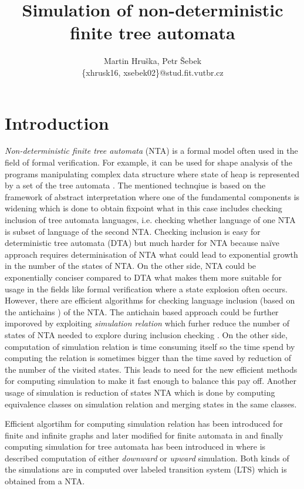 \documentclass[a4paper, 12pt]{article}
\title{Simulation of non-deterministic finite tree automata}
\author{Martin Hruška, Petr Šebek\\\{xhrusk16, xsebek02\}@stud.fit.vutbr.cz}
\date{}
\begin{document}
\maketitle

\section{Introduction}
\label{sec:intro}

\textit{Non-deterministic finite tree automata} (NTA) is a formal model often used in the field of formal verification.
For example, it can be used for shape analysis of the programs manipulating complex data structure where
state of heap is represented by a set of the tree automata \cite{methods12}.
The mentioned technqiue is based on the framework of abstract interpretation where one of the fundamental components
is widening which is done to obtain fixpoint what in this case includes checking inclusion of tree automata languages, i.e.
checking whether language of one NTA is subset of language of the second NTA.
Checking inclusion is easy for deterministic tree automata (DTA) but much harder for NTA because
na{\"i}ve approach requires determinisation of NTA what could lead to exponential growth in the number of the states of NTA.
On the other side, NTA could be exponentially conciser compared to DTA what makes them more suitable for usage in the fields
like formal verification where a state explosion often occurs.
However, there are efficient algorithms for checking language inclusion (based on the antichains \cite{tacas10}) of the NTA.
The antichain based approach could be further imporoved by exploiting \emph{simulation relation} which furher reduce
the number of states of NTA needed to explore during inclusion checking \cite{tacas10}.
On the other side, computation of simulation relation is time consuming itself so the time spend by computing the relation
is sometimes bigger than the time saved by reduction of the number of the visited states.
This leads to need for the new efficient methods for computing simulation to make it fast enough to balance this pay off.
Another usage of simulation is reduction of states NTA which is done by computing equivalence classes on simulation relation and merging states in the same classes.

Efficient algortihm for computing simulation relation has been introduced for finite and infinite graphs \cite{focs95} and
later modified for finite automata in \cite{ilie:nfa} and finally computing simulation for tree automata has been introduced in \cite{tacas08}
where is described computation of either \emph{downward} or \emph{upward} simulation.
Both kinds of the simulations are in \cite{tacas08} computed over labeled transition system (LTS) which is obtained from a NTA.
\end{document}
